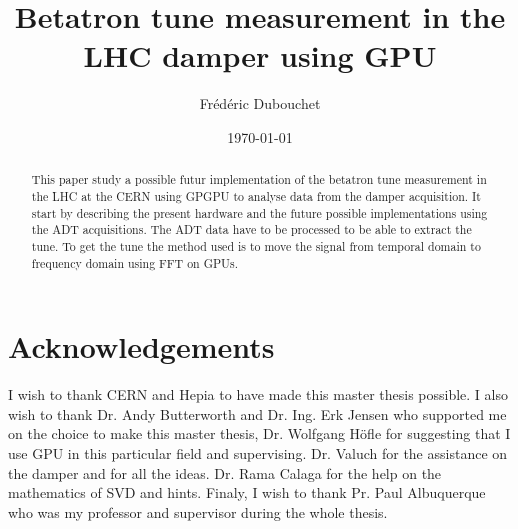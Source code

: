 \documentclass[a4paper]{report}
\title{Betatron tune measurement in the LHC damper using GPU}
\author{Fr\'ed\'eric Dubouchet}
\date{\today}
\begin{document}
\maketitle

\begin{abstract}
	This paper study a possible futur implementation of the betatron tune measurement in the \gls{LHC} at the \gls{CERN} using \gls{GPGPU} to analyse data from the \gls{damper} acquisition. It start by describing the present hardware and the future possible implementations using the \gls{ADT} acquisitions. The \gls{ADT} data have to be processed to be able to extract the \gls{tune}. To get the tune the method used is to move the signal from temporal domain to frequency domain using \gls{FFT} on \glspl{GPU}.
\end{abstract}

\chapter*{Acknowledgements}
	I wish to thank \gls{CERN} and \gls{Hepia} to have made this master thesis possible. I also wish to thank Dr. Andy Butterworth and Dr. Ing. Erk Jensen who supported me on the choice to make this master thesis, Dr. Wolfgang H{\"o}fle for suggesting that I use GPU in this particular field and supervising. Dr. Valuch for the assistance on the damper and for all the ideas. Dr. Rama Calaga for the help on the mathematics of \gls{SVD} and hints. Finaly, I wish to thank Pr. Paul Albuquerque who was my professor and supervisor during the whole thesis.

\tableofcontents
\listoffigures
\listoftables








\printglossaries


\end{document}
